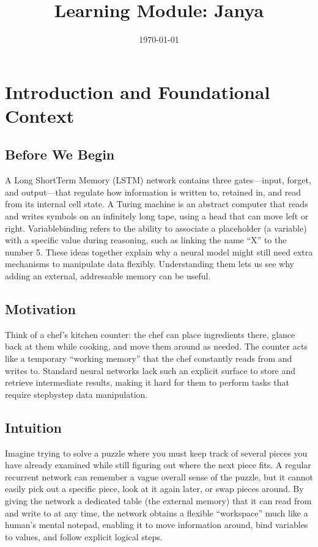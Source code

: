 \documentclass[12pt, a4paper]{article}
\title{Learning Module: Janya}
\author{}
\date{\today}
\begin{document}
\maketitle
\thispagestyle{empty}
\newpage

\tableofcontents
\newpage


\section{Introduction and Foundational Context}

\subsection{Before We Begin}
A Long ShortTerm Memory (LSTM) network contains three gates---input, forget, and output---that regulate how information is written to, retained in, and read from its internal cell state.  
A Turing machine is an abstract computer that reads and writes symbols on an infinitely long tape, using a head that can move left or right.  
Variablebinding refers to the ability to associate a placeholder (a variable) with a specific value during reasoning, such as linking the name ``X'' to the number 5.  
These ideas together explain why a neural model might still need extra mechanisms to manipulate data flexibly.  
Understanding them lets us see why adding an external, addressable memory can be useful.

\subsection{Motivation}
Think of a chef's kitchen counter: the chef can place ingredients there, glance back at them while cooking, and move them around as needed. The counter acts like a temporary ``working memory'' that the chef constantly reads from and writes to. Standard neural networks lack such an explicit surface to store and retrieve intermediate results, making it hard for them to perform tasks that require stepbystep data manipulation.  

\subsection{Intuition}
Imagine trying to solve a puzzle where you must keep track of several pieces you have already examined while still figuring out where the next piece fits. A regular recurrent network can remember a vague overall sense of the puzzle, but it cannot easily pick out a specific piece, look at it again later, or swap pieces around. By giving the network a dedicated table (the external memory) that it can read from and write to at any time, the network obtains a flexible ``workspace'' much like a human's mental notepad, enabling it to move information around, bind variables to values, and follow explicit logical steps.
\end{document}
